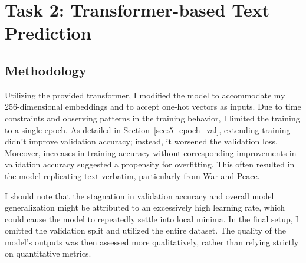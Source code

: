 \documentclass[12pt]{article} \usepackage{COSC420style} \usepackage{soul}
\begin{document}
\section{Task 2: Transformer-based Text Prediction}

\subsection{Methodology}

Utilizing the provided transformer, I modified the model to accommodate my
256-dimensional embeddings and to accept one-hot vectors as inputs. Due to time
constraints and observing patterns in the training behavior, I limited the
training to a single epoch. As detailed in Section~\ref{sec:5_epoch_val},
extending training didn’t improve validation accuracy; instead, it worsened the
validation loss. Moreover, increases in training accuracy without corresponding
improvements in validation accuracy suggested a propensity for overfitting. This
often resulted in the model replicating text verbatim, particularly from War and
Peace.

I should note that the stagnation in validation accuracy and overall model
generalization might be attributed to an excessively high learning rate, which
could cause the model to repeatedly settle into local minima. In the final
setup, I omitted the validation split and utilized the entire dataset. The
quality of the model's outputs was then assessed more qualitatively, rather than
relying strictly on quantitative metrics.
\end{document}

